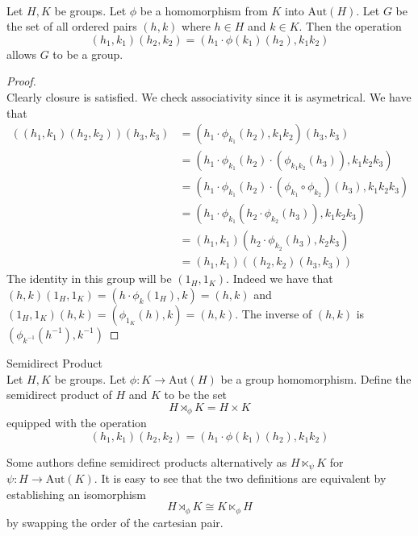 \documentclass[a4paper]{article}
\begin{document}
\begin{prp}{}{}\\
Let $H,K$ be groups. Let $\phi$ be a homomorphism from $K$ into $\text{Aut}(H)$. Let $G$ be the set of all ordered pairs $(h,k)$ where $h\in H$ and $k\in K$. Then the operation $$(h_1,k_1)(h_2,k_2)=\left(h_1\cdot\phi(k_1)(h_2),k_1k_2\right)$$ allows $G$ to be a group. 
\begin{proof}\\
Clearly closure is satisfied. We check associativity since it is asymetrical. We have that 
\begin{align*}
((h_1,k_1)(h_2,k_2))(h_3,k_3)&=\left(h_1\cdot\phi_{k_1}(h_2),k_1k_2\right)(h_3,k_3)\\
&=(h_1\cdot\phi_{k_1}(h_2)\cdot(\phi_{k_1k_2}(h_3)),k_1k_2k_3)\\
&=(h_1\cdot\phi_{k_1}(h_2)\cdot(\phi_{k_1}\circ\phi_{k_2})(h_3),k_1k_2k_3)\\
&=(h_1\cdot\phi_{k_1}(h_2\cdot\phi_{k_2}(h_3)),k_1k_2k_3)\\
&=(h_1,k_1)(h_2\cdot\phi_{k_2}(h_3),k_2k_3)\\
&=(h_1,k_1)((h_2,k_2)(h_3,k_3))
\end{align*}
The identity in this group will be $(1_H,1_K)$. Indeed we have that $(h,k)(1_H,1_K)=(h\cdot\phi_{k}(1_H),k)=(h,k)$ and $(1_H,1_K)(h,k)=(\phi_{1_K}(h),k)=(h,k)$. The inverse of $(h,k)$ is $(\phi_{k^{-1}}(h^{-1}),k^{-1})$
\end{proof}
\end{prp}

\begin{defn}{Semidirect Product}{}\\
Let $H,K$ be groups. Let $\phi:K\to\text{Aut}(H)$ be a group homomorphism. Define the semidirect product of $H$ and $K$ to be the set $$H\rtimes_\phi K=H\times K$$ equipped with the operation $$(h_1,k_1)(h_2,k_2)=\left(h_1\cdot\phi(k_1)(h_2),k_1k_2\right)$$
\end{defn}

Some authors define semidirect products alternatively as $H\ltimes_\psi K$ for $\psi:H\to\text{Aut}(K)$. It is easy to see that the two definitions are equivalent by establishing an isomorphism $$H\rtimes_\phi K\cong K\ltimes_\phi H$$ by swapping the order of the cartesian pair. 
\end{document}
